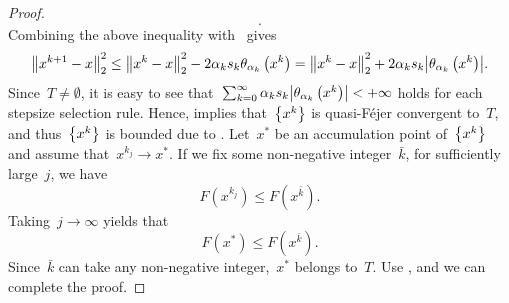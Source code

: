 \documentclass[../main]{subfiles}
\begin{document}
\begin{proof}
\begin{equation}
        .\end{equation}
    Combining the above inequality with~ gives
    \begin{equation}
        \norm*{x^{k + 1} - x}_2^2 \le \norm*{x^k - x}_2^2 - 2 \alpha_k s_k \theta_{\alpha_k}\left(x^k\right) = \norm*{x^k - x}_2^2 + 2 \alpha_k s_k \abs*{\theta_{\alpha_k}\left(x^k\right)}
        .\end{equation}
    Since~$T \neq \emptyset$, it is easy to see that~$\sum_{k = 0}^{\infty} \alpha_k s_k \abs*{\theta_{\alpha_k}\left(x^k\right)} < + \infty$ holds for each stepsize selection rule.
    Hence,  implies that~$\set*{x^k}$ is quasi-F\'ejer convergent to~$T$, and thus~$\set*{x^k}$ is bounded due to .
    Let~$x^*$ be an accumulation point of~$\set*{x^k}$ and assume that~$x^{k_j} \to x^*$.
    If we fix some non-negative integer~$\bar{k}$, for sufficiently large~$j$, we have
    \begin{equation}
        F\left(x^{k_j}\right) \le F\left(x^{\bar{k}}\right)
        .\end{equation}
    Taking~$j \to \infty$ yields that
    \begin{equation}
        F\left(x^*\right) \le F\left(x^{\bar{k}}\right)
        .\end{equation}
    Since~$\bar{k}$ can take any non-negative integer,~$x^*$ belongs to~$T$.
    Use , and we can complete the proof.
\end{proof}
\end{document}
